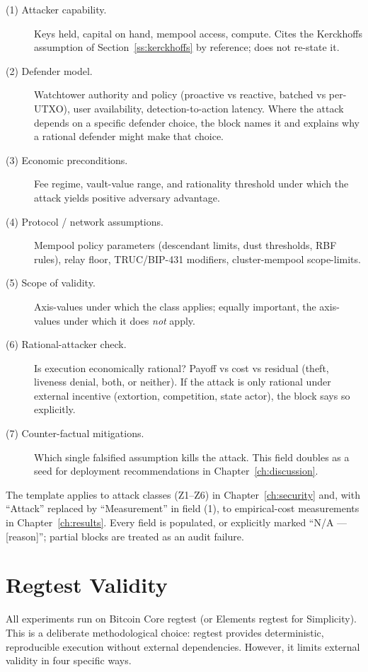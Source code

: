 \begin{description}
\item[(1) Attacker capability.] Keys held, capital on hand, mempool
  access, compute. Cites the Kerckhoffs assumption of
  Section~\ref{ss:kerckhoffs} by reference; does not re-state it.
\item[(2) Defender model.] Watchtower authority and policy
  (proactive vs reactive, batched vs per-UTXO), user availability,
  detection-to-action latency. Where the attack depends on a specific
  defender choice, the block names it and explains why a rational
  defender might make that choice.
\item[(3) Economic preconditions.] Fee regime, vault-value range, and
  rationality threshold under which the attack yields positive
  adversary advantage.
\item[(4) Protocol / network assumptions.] Mempool policy parameters
  (descendant limits, dust thresholds, RBF rules), relay floor,
  TRUC/BIP-431 modifiers, cluster-mempool scope-limits.
\item[(5) Scope of validity.] Axis-values under which the class
  applies; equally important, the axis-values under which it does
  \emph{not} apply.
\item[(6) Rational-attacker check.] Is execution economically rational?
  Payoff vs cost vs residual (theft, liveness denial, both, or neither).
  If the attack is only rational under external incentive (extortion,
  competition, state actor), the block says so explicitly.
\item[(7) Counter-factual mitigations.] Which single falsified
  assumption kills the attack. This field doubles as a seed for
  deployment recommendations in Chapter~\ref{ch:discussion}.
\end{description}

The template applies to attack classes (Z1--Z6) in
Chapter~\ref{ch:security} and, with ``Attack'' replaced by
``Measurement'' in field (1), to empirical-cost measurements in
Chapter~\ref{ch:results}. Every field is populated, or explicitly
marked ``N/A --- [reason]''; partial blocks are treated as an audit
failure.

\section{Regtest Validity} \label{se:regtest_validity}

All experiments run on Bitcoin Core regtest (or Elements regtest for Simplicity). This
is a deliberate methodological choice: regtest provides deterministic, reproducible
execution without external dependencies. However, it limits external validity in
four specific ways.

